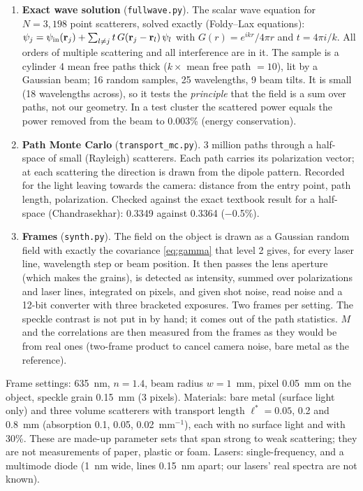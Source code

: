 \documentclass[11pt]{article}
\newcommand{\fwN}{3{,}198}
\newcommand{\fwSamples}{16}
\newcommand{\fwThick}{4}
\newcommand{\fwEnergy}{0.003\%}
\newcommand{\mcPhotons}{3}
\newcommand{\mcNormal}{0.3349}
\newcommand{\mcExact}{0.3364}
\newcommand{\mcDevPct}{$-$0.5}
\begin{document}
\begin{enumerate}
\item \textbf{Exact wave solution} (\texttt{fullwave.py}). The scalar wave equation for $N=\fwN$ point scatterers,
  solved exactly (Foldy--Lax equations): $\psi_j=\psi_{\rm in}(\mathbf{r}_j)+\sum_{l\ne j}t\,G(\mathbf{r}_j-\mathbf{r}_l)\,\psi_l$
  with $G(r)=e^{ikr}/4\pi r$ and $t=4\pi i/k$. All orders of multiple scattering and all interference are in it.
  The sample is a cylinder \fwThick{} mean free paths thick ($k\times$ mean free path $=10$), lit by a Gaussian beam;
  \fwSamples{} random samples, 25 wavelengths, 9 beam tilts. It is small (18 wavelengths across), so it tests the
  \emph{principle} that the field is a sum over paths, not our geometry. In a test cluster the scattered power equals
  the power removed from the beam to \fwEnergy{} (energy conservation).
\item \textbf{Path Monte Carlo} (\texttt{transport\_mc.py}). \mcPhotons{} million paths through a half-space of small
  (Rayleigh) scatterers. Each path carries its polarization vector; at each scattering the direction is drawn from
  the dipole pattern. Recorded for the light leaving towards the camera: distance from the entry point, path length,
  polarization. Checked against the exact textbook result for a half-space (Chandrasekhar): \mcNormal{} against
  \mcExact{} (\mcDevPct\%).
\item \textbf{Frames} (\texttt{synth.py}). The field on the object is drawn as a Gaussian random field with exactly
  the covariance \eqref{eq:gamma} that level 2 gives, for every laser line, wavelength step or beam position. It then
  passes the lens aperture (which makes the grains), is detected as intensity, summed over polarizations and laser
  lines, integrated on pixels, and given shot noise, read noise and a 12-bit converter with three bracketed exposures.
  Two frames per setting. The speckle contrast is not put in by hand; it comes out of the path statistics. $M$ and the
  correlations are then measured from the frames as they would be from real ones (two-frame product to cancel camera
  noise, bare metal as the reference).
\end{enumerate}
Frame settings: 635~nm, $n=1.4$, beam radius $w=1$~mm, pixel 0.05~mm on the object, speckle grain 0.15~mm (3
pixels). Materials: bare metal (surface light only) and three volume scatterers with transport length
$\ell^*=0.05$, 0.2 and 0.8~mm (absorption 0.1, 0.05, 0.02~mm$^{-1}$), each with no surface light and with 30\%.
These are made-up parameter sets that span strong to weak scattering; they are not measurements of paper, plastic or
foam. Lasers: single-frequency, and a multimode diode (1~nm wide, lines 0.15~nm apart; our lasers' real spectra are
not known).
\end{document}
